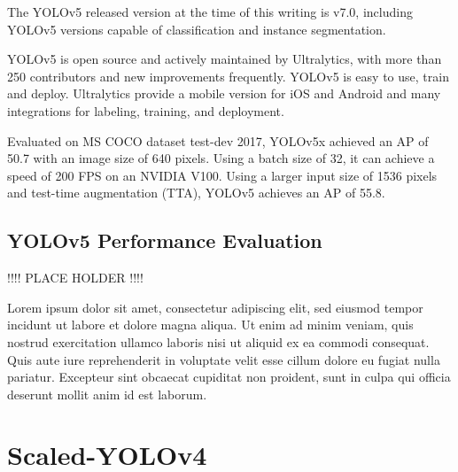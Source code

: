 \documentclass{article}
\begin{document}
The YOLOv5 released version at the time of this writing is v7.0, including YOLOv5 versions capable of classification and instance segmentation.

YOLOv5 is open source and actively maintained by Ultralytics, with more than 250 contributors and new improvements frequently. YOLOv5 is easy to use, train and deploy. Ultralytics provide a mobile version for iOS and Android and many integrations for labeling, training, and deployment.

Evaluated on MS COCO dataset test-dev 2017, YOLOv5x achieved an AP of 50.7 with an image size of 640 pixels. Using a batch size of 32, it can achieve a speed of 200 FPS on an NVIDIA V100. Using a larger input size of 1536 pixels and test-time augmentation (TTA), YOLOv5 achieves an AP of 55.8.

\subsection{YOLOv5 Performance Evaluation}

!!!! PLACE HOLDER !!!!

Lorem ipsum dolor sit amet, consectetur adipiscing elit, sed eiusmod tempor incidunt ut labore et dolore magna aliqua. Ut enim ad minim veniam, quis nostrud exercitation ullamco laboris nisi ut aliquid ex ea commodi consequat. Quis aute iure reprehenderit in voluptate velit esse cillum dolore eu fugiat nulla pariatur. Excepteur sint obcaecat cupiditat non proident, sunt in culpa qui officia deserunt mollit anim id est laborum.



\section{Scaled-YOLOv4}
\end{document}

